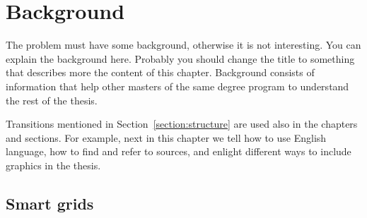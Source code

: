 \chapter{Background}
\label{chapter:background} 

The problem must have some background, otherwise it is not
interesting.  You can explain the background here. Probably you should
change the title to something that describes more the content of this
chapter. Background consists of information that help other masters of
the same degree program to understand the rest of the thesis.

Transitions mentioned in Section~\ref{section:structure} are used also
in the chapters and sections. For example, next in this chapter we
tell how to use English language, how to find and refer to sources,
and enlight different ways to include graphics in the thesis.

\section{Smart grids }

